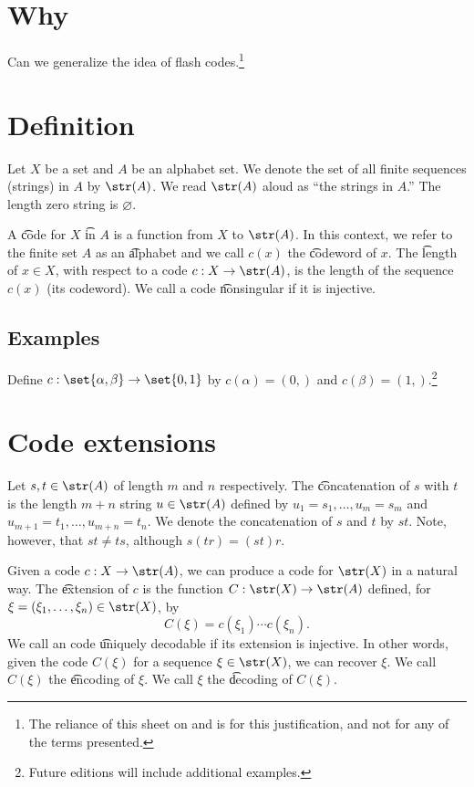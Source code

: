 
\section*{Why}

Can we generalize the idea of flash codes.\footnote{The reliance of this sheet on and is for this justification, and not for any of the terms presented.}

\section*{Definition}

Let $X$ be a set and $A$ be an alphabet set.
We denote the set of all finite sequences (strings) in $A$ by $\str(A)$.
We read $\str(A)$ aloud as ``the strings in $A$.''
The length zero string is $\varnothing$.

A \t{code} for $X$ \t{in} $A$ is a function from $X$ to $\str(A)$.
In this context, we refer to the finite set $A$ as an \t{alphabet} and we call $c(x)$ the \t{codeword} of $x$.
The \t{length} of $x \in X$, with respect to a code $c: X \to \str(A)$, is the length of the sequence $c(x)$ (its codeword).
We call a code \t{nonsingular} if it is injective.

\subsection*{Examples}

Define $c: \set{\alpha , \beta } \to \set{0, 1}$ by $c(\alpha ) = (0,)$ and $c(\beta ) = (1,)$.\footnote{Future editions will include additional examples.}

\section*{Code extensions}


Let $s,t \in \str(A)$ of length $m$ and $n$ respectively.
The \t{concatenation} of $s$ with $t$ is the length $m+n$ string $u \in \str(A)$ defined by $u_{1} = s_1, \dots , u_m = s_m$ and $u_{m+1} = t_1, \dots , u_{m+n} = t_n$.
We denote the concatenation of $s$ and $t$ by $st$.
Note, however, that $st \neq ts$, although $s(tr) = (st)r$.

Given a code $c: X \to \str(A)$, we can produce a code for $\str(X)$ in a natural way.
The \t{extension} of $c$ is the function $C: \str(X) \to \str(A)$ defined, for $\xi  = (\xi _1, \dots , \xi _n) \in \str(X)$, by
\[
C(\xi ) = c(\xi _1) \cdots c(\xi _n).
\]
We call an code \t{uniquely decodable} if its extension is injective.
In other words, given the code $C(\xi )$ for a sequence $\xi \in \str(X)$, we can recover $\xi $.
We call $C(\xi )$ the \t{encoding} of $\xi $.
We call $\xi $ the \t{decoding} of $C(\xi )$.
